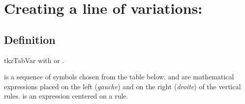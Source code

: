 \section{Creating a line of variations: }
\subsection{Definition}

\begin{NewMacroBox}{tkzTabVar}{}
  with  or .

\noindent{} is a sequence of symbols chosen from the table below.  and  are mathematical expressions placed on the left (\emph{gauche}) and on the right (\emph{droite}) of the vertical rules.  is an expression centered on a rule.


\end{NewMacroBox}
